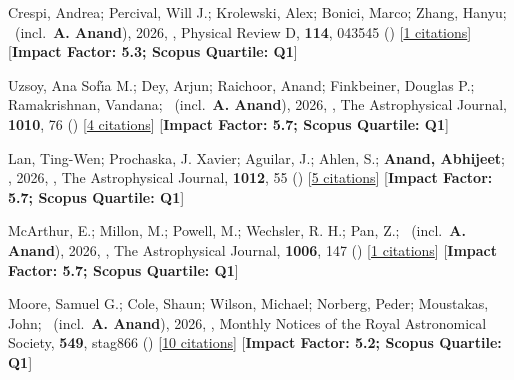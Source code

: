 \item[{\color{numcolor}\scriptsize37}] Crespi, Andrea; Percival, Will J.; Krolewski, Alex; Bonici, Marco; Zhang, Hanyu; \etal\ (incl.\ \textbf{A. Anand}), 2026, , Physical Review D, \textbf{114}, 043545 () [\href{https://ui.adsabs.harvard.edu/abs/2026PhRvD.114d3545C}{1 citations}] [\textbf{Impact Factor: 5.3; Scopus Quartile: Q1}]

\item[{\color{numcolor}\scriptsize36}] Uzsoy, Ana Sof{\'\i}a M.; Dey, Arjun; Raichoor, Anand; Finkbeiner, Douglas P.; Ramakrishnan, Vandana; \etal\ (incl.\ \textbf{A. Anand}), 2026, , The Astrophysical Journal, \textbf{1010}, 76 () [\href{https://ui.adsabs.harvard.edu/abs/2026ApJ..1010...76U}{4 citations}] [\textbf{Impact Factor: 5.7; Scopus Quartile: Q1}]

\item[{\color{numcolor}\scriptsize35}] Lan, Ting-Wen; Prochaska, J. Xavier; Aguilar, J.; Ahlen, S.; \textbf{Anand, Abhijeet}; \etal, 2026, , The Astrophysical Journal, \textbf{1012}, 55 () [\href{https://ui.adsabs.harvard.edu/abs/2026ApJ..1012...55L}{5 citations}] [\textbf{Impact Factor: 5.7; Scopus Quartile: Q1}]

\item[{\color{numcolor}\scriptsize34}] McArthur, E.; Millon, M.; Powell, M.; Wechsler, R. H.; Pan, Z.; \etal\ (incl.\ \textbf{A. Anand}), 2026, , The Astrophysical Journal, \textbf{1006}, 147 () [\href{https://ui.adsabs.harvard.edu/abs/2026ApJ..1006..147M}{1 citations}] [\textbf{Impact Factor: 5.7; Scopus Quartile: Q1}]

\item[{\color{numcolor}\scriptsize33}] Moore, Samuel G.; Cole, Shaun; Wilson, Michael; Norberg, Peder; Moustakas, John; \etal\ (incl.\ \textbf{A. Anand}), 2026, , Monthly Notices of the Royal Astronomical Society, \textbf{549}, stag866 () [\href{https://ui.adsabs.harvard.edu/abs/2026MNRAS.549ag866M}{10 citations}] [\textbf{Impact Factor: 5.2; Scopus Quartile: Q1}]

